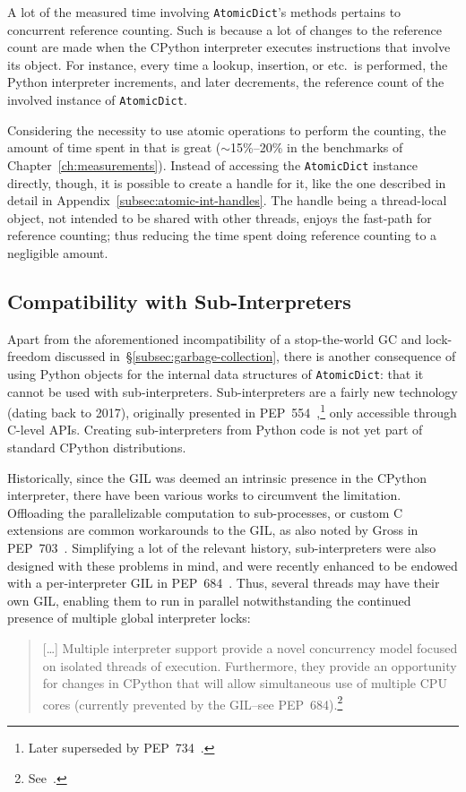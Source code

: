 A lot of the measured time involving \texttt{AtomicDict}'s methods pertains to concurrent reference counting.
Such is because a lot of changes to the reference count are made when the CPython interpreter executes instructions that involve its object.
For instance, every time a lookup, insertion, or etc.\ is performed, the Python interpreter increments, and later decrements, the reference count of the involved instance of \texttt{AtomicDict}.

Considering the necessity to use atomic operations to perform the counting, the amount of time spent in that is great ($\sim$15\%--20\% in the benchmarks of Chapter~\ref{ch:measurements}).
Instead of accessing the \texttt{AtomicDict} instance directly, though, it is possible to create a handle for it, like the one described in detail in Appendix~\ref{subsec:atomic-int-handles}.
The handle being a thread-local object, not intended to be shared with other threads, enjoys the fast-path for reference counting; thus reducing the time spent doing reference counting to a negligible amount.


\subsection{Compatibility with Sub-Interpreters}\label{subsec:compatibility-with-sub-interpreters}

Apart from the aforementioned incompatibility of a stop-the-world GC and lock-freedom discussed in~\S\ref{subsec:garbage-collection}, there is another consequence of using Python objects for the internal data structures of \texttt{AtomicDict}: that it cannot be used with sub-interpreters.
Sub-interpreters are a fairly new technology (dating back to 2017), originally presented in PEP~554~\cite{pep554},\footnote{%
    Later superseded by PEP~734~\cite{pep734}.
} only accessible through C-level APIs.
Creating sub-interpreters from Python code is not yet part of standard CPython distributions.

Historically, since the GIL was deemed an intrinsic presence in the CPython interpreter, there have been various works to circumvent the limitation.
Offloading the parallelizable computation to sub-processes, or custom C extensions are common workarounds to the GIL, as also noted by Gross in PEP~703~\cite{pep703}.
Simplifying a lot of the relevant history, sub-interpreters were also designed with these problems in mind, and were recently enhanced to be endowed with a per-interpreter GIL in PEP~684~\cite{pep684}.
Thus, several threads may have their own GIL, enabling them to run in parallel notwithstanding the continued presence of multiple global interpreter locks:
\begin{quote}
    [\ldots] Multiple interpreter support provide a novel concurrency model focused on isolated threads of execution.
    Furthermore, they provide an opportunity for changes in CPython that will allow simultaneous use of multiple CPU cores (currently prevented by the GIL--see PEP~684).\footnote{See~\cite{pep554}.}
\end{quote}

